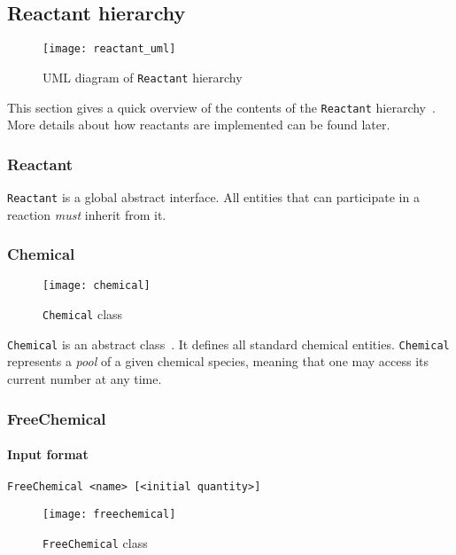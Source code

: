 
\subsection{Reactant hierarchy}

\begin{figure}[!h]
  \centering
  \texttt{[image: reactant\_uml]}
  \caption{UML diagram of \texttt{Reactant} hierarchy}
  \label{fig:reactant_uml}
\end{figure}

This section gives a quick overview of the contents of the \texttt{Reactant} hierarchy~.
More details about how reactants are implemented can be found later.

\subsubsection{Reactant}

\texttt{Reactant} is a global abstract interface.
All entities that can participate in a reaction \emph{must} inherit from it.

\subsubsection{Chemical}

\begin{figure}[!h]
  \centering
  \texttt{[image: chemical]}
  \caption{\texttt{Chemical} class}
  \label{fig:chemical}
\end{figure}

\texttt{Chemical} is an abstract class~.
It defines all standard chemical entities.
\texttt{Chemical} represents a \emph{pool} of a given chemical species,
meaning that one may access its current number at any time.

\subsubsection{FreeChemical}

\paragraph{Input format}
\begin{verbatim}
FreeChemical <name> [<initial quantity>]
\end{verbatim}

\begin{figure}[!h]
  \centering
  \texttt{[image: freechemical]}
  \caption{\texttt{FreeChemical} class}
  \label{fig:free_chemical}
\end{figure}

